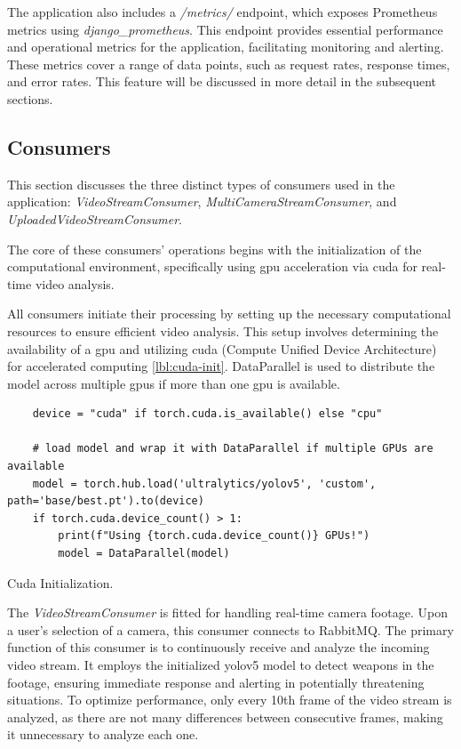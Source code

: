 The application also includes a \textit{/metrics/} endpoint, which exposes Prometheus metrics using 
\textit{django\_prometheus}. This endpoint provides essential performance and operational metrics for the 
application, facilitating monitoring and alerting. These metrics cover a range of data points, such as request rates, 
response times, and error rates. This feature will be discussed in more detail in the subsequent sections.


\subsection{Consumers}
This section discusses the three distinct types of consumers used in the 
application: \textit{VideoStreamConsumer}, \textit{MultiCameraStreamConsumer}, and \textit{UploadedVideoStreamConsumer}.

The core of these consumers' operations begins with the initialization of the computational environment, 
specifically using \ac{gpu} acceleration via \ac{cuda} for real-time video analysis.

All consumers initiate their processing by setting up the necessary computational resources to ensure efficient 
video analysis. This setup involves determining the availability of a \ac{gpu} and utilizing 
\ac{cuda} (Compute Unified Device Architecture) for accelerated computing \ref{lbl:cuda-init}. DataParallel is used 
to distribute the model across multiple \ac{gpu}s if more than one \ac{gpu} is available.

\begin{listing}[h]
    \begin{verbatim}
    device = "cuda" if torch.cuda.is_available() else "cpu"

    # load model and wrap it with DataParallel if multiple GPUs are available
    model = torch.hub.load('ultralytics/yolov5', 'custom', path='base/best.pt').to(device)
    if torch.cuda.device_count() > 1:
        print(f"Using {torch.cuda.device_count()} GPUs!")
        model = DataParallel(model)
    \end{verbatim}
    \caption{Cuda Initialization.}
    \label{lbl:cuda-init}
    \end{listing}

The \textit{VideoStreamConsumer} is fitted for handling real-time camera footage. Upon a user's selection of a camera, 
this consumer connects to RabbitMQ. 
The primary function of this consumer is to continuously receive and analyze the incoming video stream. 
It employs the initialized \ac{yolo}v5 model to detect weapons in the footage, ensuring immediate response and 
alerting in potentially threatening situations. To optimize performance, only every 10th frame of the video stream 
is analyzed, as there are not many differences between consecutive frames, making it unnecessary to analyze each one.

